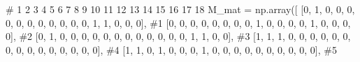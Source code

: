 \documentclass[
  letterpaper,
  DIV=11,
  numbers=noendperiod]{scrreprt}
\newenvironment{Shaded}{\begin{snugshade}}{\end{snugshade}}
\newcommand{\CommentTok}[1]{\textcolor[rgb]{0.37,0.37,0.37}{#1}}
\newcommand{\DecValTok}[1]{\textcolor[rgb]{0.68,0.00,0.00}{#1}}
\newcommand{\NormalTok}[1]{\textcolor[rgb]{0.00,0.23,0.31}{#1}}
\newcommand{\OperatorTok}[1]{\textcolor[rgb]{0.37,0.37,0.37}{#1}}
\begin{document}
\begin{tcolorbox}
\begin{Shaded}
\begin{Highlighting}[]
\CommentTok{\#                    1  2  3  4  5  6  7  8  9  10 11 12 13 14 15 16 17 18}
\NormalTok{M\_mat }\OperatorTok{=}\NormalTok{ np.array([  [}\DecValTok{0}\NormalTok{, }\DecValTok{1}\NormalTok{, }\DecValTok{0}\NormalTok{, }\DecValTok{0}\NormalTok{, }\DecValTok{0}\NormalTok{, }\DecValTok{0}\NormalTok{, }\DecValTok{0}\NormalTok{, }\DecValTok{0}\NormalTok{, }\DecValTok{0}\NormalTok{, }\DecValTok{0}\NormalTok{, }\DecValTok{0}\NormalTok{, }\DecValTok{0}\NormalTok{, }\DecValTok{0}\NormalTok{, }\DecValTok{1}\NormalTok{, }\DecValTok{1}\NormalTok{, }\DecValTok{0}\NormalTok{, }\DecValTok{0}\NormalTok{, }\DecValTok{0}\NormalTok{], }\CommentTok{\#1}
\NormalTok{                    [}\DecValTok{0}\NormalTok{, }\DecValTok{0}\NormalTok{, }\DecValTok{0}\NormalTok{, }\DecValTok{0}\NormalTok{, }\DecValTok{0}\NormalTok{, }\DecValTok{0}\NormalTok{, }\DecValTok{0}\NormalTok{, }\DecValTok{0}\NormalTok{, }\DecValTok{1}\NormalTok{, }\DecValTok{0}\NormalTok{, }\DecValTok{0}\NormalTok{, }\DecValTok{0}\NormalTok{, }\DecValTok{0}\NormalTok{, }\DecValTok{1}\NormalTok{, }\DecValTok{0}\NormalTok{, }\DecValTok{0}\NormalTok{, }\DecValTok{0}\NormalTok{, }\DecValTok{0}\NormalTok{], }\CommentTok{\#2}
\NormalTok{                    [}\DecValTok{0}\NormalTok{, }\DecValTok{1}\NormalTok{, }\DecValTok{0}\NormalTok{, }\DecValTok{0}\NormalTok{, }\DecValTok{0}\NormalTok{, }\DecValTok{0}\NormalTok{, }\DecValTok{0}\NormalTok{, }\DecValTok{0}\NormalTok{, }\DecValTok{0}\NormalTok{, }\DecValTok{0}\NormalTok{, }\DecValTok{0}\NormalTok{, }\DecValTok{0}\NormalTok{, }\DecValTok{0}\NormalTok{, }\DecValTok{0}\NormalTok{, }\DecValTok{1}\NormalTok{, }\DecValTok{1}\NormalTok{, }\DecValTok{0}\NormalTok{, }\DecValTok{0}\NormalTok{], }\CommentTok{\#3}
\NormalTok{                    [}\DecValTok{1}\NormalTok{, }\DecValTok{1}\NormalTok{, }\DecValTok{1}\NormalTok{, }\DecValTok{0}\NormalTok{, }\DecValTok{0}\NormalTok{, }\DecValTok{0}\NormalTok{, }\DecValTok{0}\NormalTok{, }\DecValTok{0}\NormalTok{, }\DecValTok{0}\NormalTok{, }\DecValTok{0}\NormalTok{, }\DecValTok{0}\NormalTok{, }\DecValTok{0}\NormalTok{, }\DecValTok{0}\NormalTok{, }\DecValTok{0}\NormalTok{, }\DecValTok{0}\NormalTok{, }\DecValTok{0}\NormalTok{, }\DecValTok{0}\NormalTok{, }\DecValTok{0}\NormalTok{], }\CommentTok{\#4}
\NormalTok{                    [}\DecValTok{1}\NormalTok{, }\DecValTok{1}\NormalTok{, }\DecValTok{0}\NormalTok{, }\DecValTok{1}\NormalTok{, }\DecValTok{0}\NormalTok{, }\DecValTok{0}\NormalTok{, }\DecValTok{0}\NormalTok{, }\DecValTok{1}\NormalTok{, }\DecValTok{0}\NormalTok{, }\DecValTok{0}\NormalTok{, }\DecValTok{0}\NormalTok{, }\DecValTok{0}\NormalTok{, }\DecValTok{0}\NormalTok{, }\DecValTok{0}\NormalTok{, }\DecValTok{0}\NormalTok{, }\DecValTok{0}\NormalTok{, }\DecValTok{0}\NormalTok{, }\DecValTok{0}\NormalTok{], }\CommentTok{\#5}

\end{Highlighting}
\end{Shaded}
\end{tcolorbox}
\end{document}
